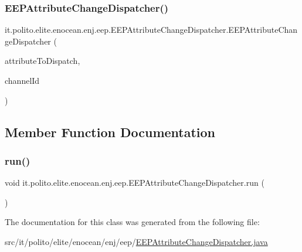 \subsubsection{\texorpdfstring{E\+E\+P\+Attribute\+Change\+Dispatcher()}{EEPAttributeChangeDispatcher()}\hspace{0.1cm}{\footnotesize\ttfamily [2/2]}}
{\footnotesize\ttfamily it.\+polito.\+elite.\+enocean.\+enj.\+eep.\+E\+E\+P\+Attribute\+Change\+Dispatcher.\+E\+E\+P\+Attribute\+Change\+Dispatcher (\begin{DoxyParamCaption}\item[{\hyperlink{classit_1_1polito_1_1elite_1_1enocean_1_1enj_1_1eep_1_1_e_e_p_attribute}{E\+E\+P\+Attribute}$<$?$>$}]{attribute\+To\+Dispatch,  }\item[{int}]{channel\+Id }\end{DoxyParamCaption})}



\subsection{Member Function Documentation}
\hypertarget{classit_1_1polito_1_1elite_1_1enocean_1_1enj_1_1eep_1_1_e_e_p_attribute_change_dispatcher_a43e5a4a2041335a3c0f32ca987bc0fb5}{}\label{classit_1_1polito_1_1elite_1_1enocean_1_1enj_1_1eep_1_1_e_e_p_attribute_change_dispatcher_a43e5a4a2041335a3c0f32ca987bc0fb5} 
\subsubsection{\texorpdfstring{run()}{run()}}
{\footnotesize\ttfamily void it.\+polito.\+elite.\+enocean.\+enj.\+eep.\+E\+E\+P\+Attribute\+Change\+Dispatcher.\+run (\begin{DoxyParamCaption}{ }\end{DoxyParamCaption})}



The documentation for this class was generated from the following file\+:\begin{DoxyCompactItemize}
\item 
src/it/polito/elite/enocean/enj/eep/\hyperlink{_e_e_p_attribute_change_dispatcher_8java}{E\+E\+P\+Attribute\+Change\+Dispatcher.\+java}\end{DoxyCompactItemize}
